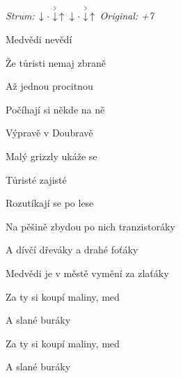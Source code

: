 \begin{song}


\begin{headerbox}
\textit{Strum:} $\Down\Miss\AccentDown\Up\ \Down\Miss\AccentDown\Up$ \quad
\textit{Original: +7}
\end{headerbox}

\begin{hchordbox}
\end{hchordbox}

\Large

\bigskip

Medvědi nevědí \par
{}Že tůristi nemaj zbraně \par
{}Až jednou procitnou \par
{}Počíhají si někde na ně \par

\bigskip

Výpravě v Doubravě \par
{}Malý grizzly ukáže se \par
{}Tůristé zajisté \par
{}Rozutíkají se po lese \par

\bigskip

Na pěšině zbydou po nich tranzistoráky \par
A dívčí dřeváky a drahé foťáky \par
{}Medvědi je v městě vymění za zlaťáky \par
{}Za ty si koupí maliny, med  \par
A slané buráky  \par
{}Za ty si koupí maliny, med  \par
A slané buráky \par

\end{song}
